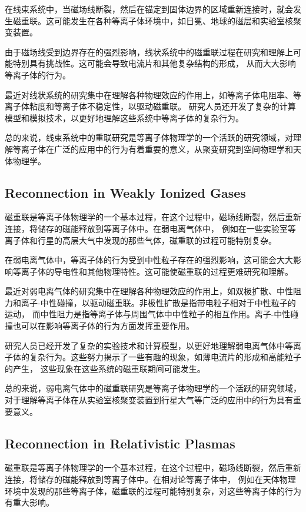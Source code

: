 \documentclass[12pt, a4paper, oneside]{article}
\begin{document}
\begin{spacing}{2.0}
在线束系统中，当磁场线断裂，然后在锚定到固体边界的区域重新连接时，就会发生磁重联。这可能发生在各种等离子体环境中，如日冕、地球的磁层和实验室核聚变装置。

由于磁场线受到边界存在的强烈影响，线状系统中的磁重联过程在研究和理解上可能特别具有挑战性。这可能会导致电流片和其他复杂结构的形成，
从而大大影响等离子体的行为。

最近对线状系统的研究集中在理解各种物理效应的作用上，如等离子体电阻率、等离子体粘度和等离子体不稳定性，以驱动磁重联。
研究人员还开发了复杂的计算模型和模拟技术，以更好地理解这些系统中等离子体的复杂行为。

总的来说，线束系统中的重联研究是等离子体物理学的一个活跃的研究领域，对理解等离子体在广泛的应用中的行为有着重要的意义，从聚变研究到空间物理学和天体物理学。


\subsection{Reconnection in Weakly Ionized Gases}
磁重联是等离子体物理学的一个基本过程，在这个过程中，磁场线断裂，然后重新连接，将储存的磁能释放到等离子体中。在弱电离气体中，
例如在一些实验室等离子体和行星的高层大气中发现的那些气体，磁重联的过程可能特别复杂。

在弱电离气体中，等离子体的行为受到中性粒子存在的强烈影响，这可能会大大影响等离子体的导电性和其他物理特性。这可能使磁重联的过程更难研究和理解。

最近对弱电离气体的研究集中在理解各种物理效应的作用上，如双极扩散、中性阻力和离子-中性碰撞，以驱动磁重联。非极性扩散是指带电粒子相对于中性粒子的运动，
而中性阻力是指等离子体与周围气体中中性粒子的相互作用。离子-中性碰撞也可以在影响等离子体的行为方面发挥重要作用。

研究人员已经开发了复杂的实验技术和计算模型，以更好地理解弱电离气体中等离子体的复杂行为。这些努力揭示了一些有趣的现象，如薄电流片的形成和高能粒子的产生，
这些现象在这些系统的磁重联期间可能发生。

总的来说，弱电离气体中的磁重联研究是等离子体物理学的一个活跃的研究领域，对于理解等离子体在从实验室核聚变装置到行星大气等广泛的应用中的行为具有重要意义。
\subsection{Reconnection in Relativistic Plasmas}
磁重联是等离子体物理学的一个基本过程，在这个过程中，磁场线断裂，然后重新连接，将储存的磁能释放到等离子体中。在相对论等离子体中，
例如在天体物理环境中发现的那些等离子体，磁重联的过程可能特别复杂，对这些等离子体的行为有重大影响。


\end{spacing}
\end{document}
